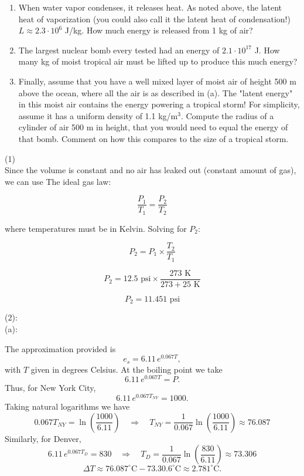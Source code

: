 \documentclass[letterpaper, 11pt]{article}
\newcommand{\1}{\mathds{1}}	%
\theoremstyle{definition}
\begin{document}
\begin{enumerate}[leftmargin=*, label=\arabic*.]
\begin{enumerate}[label=(\alph*)]
    \item When water vapor condenses, it releases heat. As noted above, the latent heat of vaporization (you could also call it the latent heat of condensation!) $L \approx 2.3 \cdot 10^6$ J/kg. How much energy is released from 1 kg of air?
    
    \item The largest nuclear bomb every tested had an energy of $2.1 \cdot 10^{17}$ J. How many kg of moist tropical air must be lifted up to produce this much energy?
    
    \item Finally, assume that you have a well mixed layer of moist air of height 500 m above the ocean, where all the air is as described in (a). The "latent energy" in this moist air contains the energy powering a tropical storm! For simplicity, assume it has a uniform density of 1.1 kg/m$^3$. Compute the radius of a cylinder of air 500 m in height, that you would need to equal the energy of that bomb. Comment on how this compares to the size of a tropical storm.
  \end{enumerate}

\end{enumerate}
\clearpage
(1)
\\
Since the volume is constant and no air has leaked out (constant amount of gas), we can use The ideal gas law:

\[
\frac{P_1}{T_1} = \frac{P_2}{T_2}
\]

where temperatures must be in Kelvin.
Solving for $P_2$:

\[
P_2 = P_1 \times \frac{T_2}{T_1}
\]

\[
P_2 = 12.5 \text{ psi} \times \frac{273 \text{ K}}{273+25 \text{ K}}
\]

\[
P_2 = 11.451 \text{ psi}
\]

(2):
\\(a):

The approximation provided is
\[
e_s = 6.11\,e^{0.067T},
\]
with $T$ given in degrees Celsius. At the boiling point we take
\[
6.11\,e^{0.067T}=P.
\]
Thus, for New York City,
\[
6.11\,e^{0.067T_{NY}}=1000.
\]
Taking natural logarithms we have
\[
0.067T_{NY}=\ln\left(\frac{1000}{6.11}\right)
\quad\Longrightarrow\quad
T_{NY}=\frac{1}{0.067}\ln\left(\frac{1000}{6.11}\right)\approx 76.087
\]
Similarly, for Denver,
\[
6.11\,e^{0.067T_{D}}=830
\quad\Longrightarrow\quad
T_{D}=\frac{1}{0.067}\ln\left(\frac{830}{6.11}\right)\approx 73.306
\]
\[
\Delta T\approx 76.087^\circ\text{C}-73.30.6^\circ\text{C}\approx 2.781^\circ\text{C}.
\]
\end{document}
